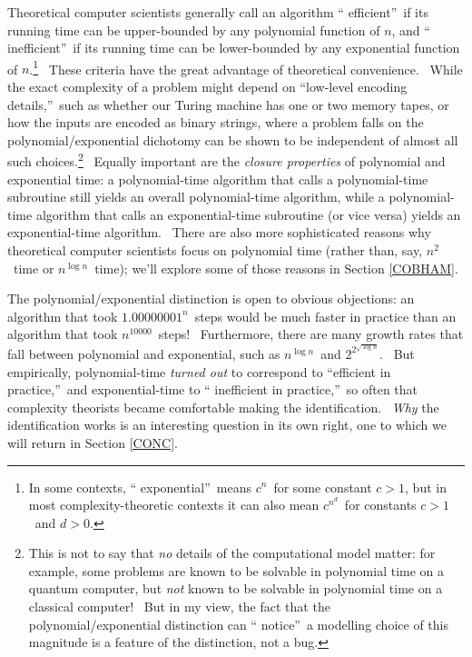 \documentclass[11pt,onecolumn]{article}%
\begin{document}
Theoretical computer scientists generally call an algorithm \textquotedblleft
efficient\textquotedblright\ if its running time can be upper-bounded by any
polynomial function of $n$, and \textquotedblleft
inefficient\textquotedblright\ if its running time can be lower-bounded by any
exponential function of $n$.\footnote{In some contexts, \textquotedblleft
exponential\textquotedblright\ means $c^{n}$\ for some constant $c>1$, but in
most complexity-theoretic contexts it can also mean $c^{n^{d}}$\ for constants
$c>1$\ and $d>0$.} \ These criteria have the great advantage of theoretical
convenience. \ While the exact complexity of a problem might depend on
\textquotedblleft low-level encoding details,\textquotedblright\ such as
whether our Turing machine has one or two memory tapes, or how the inputs are
encoded as binary strings, where a problem falls on the polynomial/exponential
dichotomy can be shown to be independent of almost all such
choices.\footnote{This is not to say that \textit{no} details of the
computational model matter: for example, some problems are known to be
solvable in polynomial time on a quantum computer, but \textit{not} known to
be solvable in polynomial time on a classical computer! \ But in my view, the
fact that the polynomial/exponential distinction can \textquotedblleft
notice\textquotedblright\ a modelling choice of this magnitude is a feature of
the distinction, not a bug.} \ Equally important are the \textit{closure
properties} of polynomial and exponential time: a polynomial-time algorithm
that calls a polynomial-time subroutine still yields an overall
polynomial-time algorithm, while a polynomial-time algorithm that calls an
exponential-time subroutine (or vice versa) yields an exponential-time
algorithm. \ There are also more sophisticated reasons why theoretical
computer scientists focus on polynomial time (rather than, say, $n^{2}$\ time
or $n^{\log n}$\ time); we'll explore some of those reasons in Section
\ref{COBHAM}.

The polynomial/exponential distinction is open to obvious objections: an
algorithm that took $1.00000001^{n}$\ steps would be much faster in practice
than an algorithm that took $n^{10000}$\ steps! \ Furthermore, there are many
growth rates that fall between polynomial and exponential, such as $n^{\log
n}$\ and $2^{2^{\sqrt{\log n}}}$. \ But empirically, polynomial-time
\textit{turned out} to correspond to \textquotedblleft efficient in
practice,\textquotedblright\ and exponential-time to \textquotedblleft
inefficient in practice,\textquotedblright\ so often that complexity theorists
became comfortable making the identification. \ \textit{Why} the
identification works is an interesting question in its own right, one to which
we will return in Section \ref{CONC}.
\end{document}
